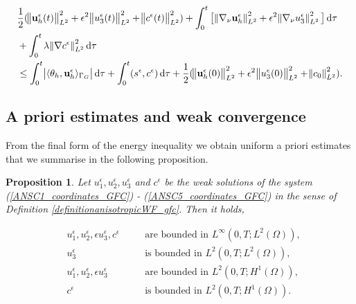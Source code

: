 \documentclass[12pt]{report}
\numberwithin{theorem}{chapter}
\numberwithin{corollary}{chapter}
\numberwithin{lemma}{chapter}
\numberwithin{remark}{chapter}
\numberwithin{definition}{chapter}
\newtheorem{prop}{Proposition}
\numberwithin{prop}{chapter}
\newcommand*\diff{\mathop{}\!\mathrm{d}}
\begin{document}
  \begin{equation}
    \begin{split}  
    & \frac{1}{2} (\norm{\mathbf{u}_h^\epsilon (t)}_{L^2}^2 + \epsilon ^ 2 \norm{u_3^\epsilon (t)}_{L^2}^2 + \norm{c^\epsilon (t)}_{L^2}^2) + \int_0 ^ t \big [\norm{\nabla_\nu \mathbf{u}_h^\epsilon}_{L^2}^2 + \epsilon ^ 2 \norm{\nabla_\nu u_3^\epsilon}_{L^2}^2 \big ] \diff \tau \\
    & + \int_0 ^ t \lambda \norm{\nabla c^\epsilon}_{L^2}^2 \diff \tau \\
    & \leq \int_0^t \abs{\langle \theta_h, \mathbf{u}^\epsilon_h \rangle_{\Gamma_G}} \diff \tau + \int_0^t (s^\epsilon,c^\epsilon) \diff \tau + \frac{1}{2} (\norm{\mathbf{u}_h^\epsilon (0)}_{L^2}^2 + \epsilon ^ 2 \norm{u_3^\epsilon (0)}_{L^2}^2 + \norm{c_0}_{L^2}^2). \raisetag{60pt} \label{finalformEIEQ_gfc}
    \end{split}
  \end{equation}
    
  \subsection{A priori estimates and weak convergence}
  
  From the final form of the energy inequality we obtain uniform a priori estimates that we summarise in the following proposition.
  
  \begin{prop}
    Let $u^\epsilon_1, u^\epsilon_2, u^\epsilon_3$ and $c^\epsilon$ be the weak solutions of the system (\ref{ANSC1_coordinates_GFC}) - (\ref{ANSC5_coordinates_GFC}) in the sense of Definition \ref{definitionanisotropicWF_gfc}. Then it holds,
    
    \begin{align}
      & u^\epsilon_1, u^\epsilon_2, \epsilon u^\epsilon_3, c^\epsilon & \quad & \text{are bounded in $L^\infty (0,T; L^2(\Omega)),$} \label{proposition1_gfc} \\
      & u^\epsilon_3 & \quad & \text{is bounded in $L^2 (0,T; L^2(\Omega)),$} \label{propositionExtra_gfc} \\
      & u^\epsilon_1, u^\epsilon_2, \epsilon u^\epsilon_3 & \quad & \text{are bounded in $L^2(0,T; H^1(\Omega)),$} \label{proposition2_gfc} \\
      & c^\epsilon & \quad & \text{is bounded in $L^2(0,T;H^1(\Omega)).$} \label{proposition3_gfc}
    \end{align}
    
  \end{prop}
  
\end{document}
